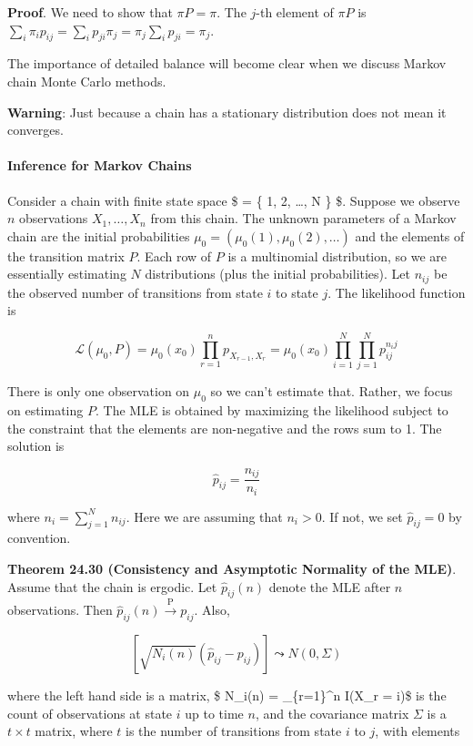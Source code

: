 \textbf{Proof}. We need to show that \(\pi P = \pi\). The \(j\)-th
element of \(\pi P\) is
\(\sum_i \pi_i p_{ij} = \sum_i p_{ji}\pi_j = \pi_j \sum_i p_{ji} = \pi_j\).

The importance of detailed balance will become clear when we discuss
Markov chain Monte Carlo methods.

\textbf{Warning}: Just because a chain has a stationary distribution
does not mean it converges.

\paragraph{Inference for Markov Chains}\label{inference-for-markov-chains}

Consider a chain with finite state space \$ = \{ 1, 2, \dots,
N \} \$. Suppose we observe \(n\) observations \(X_1, \dots, X_n\) from
this chain. The unknown parameters of a Markov chain are the initial
probabilities \(\mu_0 = (\mu_0(1), \mu_0(2), \dots)\) and the elements
of the transition matrix \(P\). Each row of \(P\) is a multinomial
distribution, so we are essentially estimating \(N\) distributions (plus
the initial probabilities). Let \(n_{ij}\) be the observed number of
transitions from state \(i\) to state \(j\). The likelihood function is

\[ \mathcal{L}(\mu_0, P) = \mu_0(x_0) \prod_{r=1}^n p_{X_{r - 1}, X_r} = \mu_0(x_0) \prod_{i=1}^N \prod_{j=1}^N p_{ij}^{n_ij} \]

There is only one observation on \(\mu_0\) so we can't estimate that.
Rather, we focus on estimating \(P\). The MLE is obtained by maximizing
the likelihood subject to the constraint that the elements are
non-negative and the rows sum to 1. The solution is

\[ \hat{p}_{ij} = \frac{n_{ij}}{n_i} \]

where \(n_i = \sum_{j=1}^N n_{ij}\). Here we are assuming that
\(n_i > 0\). If not, we set \(\hat{p}_{ij} = 0\) by convention.

\textbf{Theorem 24.30 (Consistency and Asymptotic Normality of the
MLE)}. Assume that the chain is ergodic. Let \(\hat{p}_{ij}(n)\) denote
the MLE after \(n\) observations. Then
\(\hat{p}_{ij}(n) \xrightarrow{\text{P}} p_{ij}\). Also,

\[ \left[ \sqrt{N_i(n)} (\hat{p}_{ij} - p_{ij})  \right] \leadsto N(0, \Sigma) \]

where the left hand side is a matrix, \$ N\_i(n) = \sum\_\{r=1\}\^{}n
I(X\_r = i)\$ is the count of observations at state \(i\) up to time
\(n\), and the covariance matrix \(\Sigma\) is a \(t \times t\) matrix,
where \(t\) is the number of transitions from state \(i\) to \(j\), with
elements

